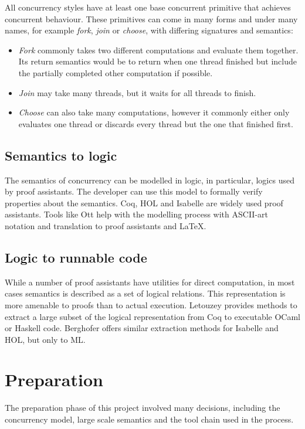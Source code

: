 \documentclass[12pt,twoside,notitlepage]{report}
\theoremstyle{plain}%
\theoremstyle{definition}
\theoremstyle{remark}
\begin{document}
All concurrency styles have at least one base concurrent primitive that achieves concurrent behaviour. These primitives can come in many forms and under many names, for example \textit{fork}, \textit{join} or \textit{choose}, with differing signatures and semantics:\label{sec:con_prims}
\begin{itemize}
\item{\textit{Fork} commonly takes two different computations and evaluate them together. Its return semantics would be to return when one thread finished but include the partially completed other computation if possible.}
\item{\textit{Join} may take many threads, but it waits for all threads to finish.}
\item{\textit{Choose} can also take many computations, however it commonly either only evaluates one thread or discards every thread but the one that finished first.}
\end{itemize}

\section{Semantics to logic}
The semantics of concurrency can be modelled in logic, in particular, logics used by proof assistants. The developer can use this model to formally verify properties about the semantics\cite{benton2008mechanized,blazy2006formal,blazy2009mechanized,leroy2009formal}. Coq\cite{Coq}, HOL and Isabelle are widely used proof assistants. Tools like Ott\cite{Ott} help with the modelling process with ASCII-art notation and translation to proof assistants and \LaTeX.


\section{Logic to runnable code}
While a number of proof assistants have utilities for direct computation, in most cases semantics is described as a set of logical relations. This representation is more amenable to proofs than to actual execution. Letouzey\cite{letouzey2008extraction} provides methods to extract a large subset of the logical representation from Coq to executable OCaml or Haskell code. Berghofer\cite{berghofer2003program} offers similar extraction methods for Isabelle and HOL, but only to ML.


\chapter{Preparation}
The preparation phase of this project involved many decisions, including the concurrency model, large scale semantics and the tool chain used in the process.
\end{document}
